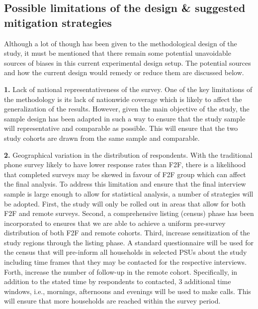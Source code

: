 \documentclass[11pt,harvard]{article}
\begin{document}
\subsection{Possible limitations of the design \& suggested mitigation strategies}

Although a lot of though has been given to the methodological design of the study, it must be mentioned that there remain some potential unavoidable sources of biases in this current experimental design setup. The potential sources and how the current design would remedy or reduce them are discussed below. 

\textbf{1.} Lack of national representativeness of the survey. One of the key limitations of the methodology is its lack of nationwide coverage which is likely to affect the generalization of the results. However, given the main objective of the study, the sample design has been adapted in such a way to ensure that the study sample will representative and comparable as possible. This will ensure that the two study cohorts are drawn from the same sample and comparable.

\textbf{2.} Geographical variation in the distribution of respondents. With the traditional phone survey likely to have lower response rates than F2F, there is a likelihood that completed surveys may be skewed in favour of F2F group which can affect the final analysis. To address this limitation and ensure that the final interview sample is large enough to allow for statistical analysis, a number of strategies will be adopted. First, the study will only be rolled out in areas that allow for both F2F and remote surveys. Second, a comprehensive listing (census) phase has been incorporated to ensures that we are able to achieve a uniform pre-survey distribution of both F2F and remote cohorts. Third, increase sensitization of the study regions through the listing phase. A standard questionnaire will be used for the census that will pre-inform all households in selected PSUs about the study including time frames that they may be contacted for the respective interviews. Forth, increase the number of follow-up in the remote cohort. Specifically, in addition to the stated time by respondents to contacted, 3 additional time windows, i.e., mornings, afternoons and evenings will be used to make calls. This will ensure that more households are reached within the survey period. 
\end{document}
